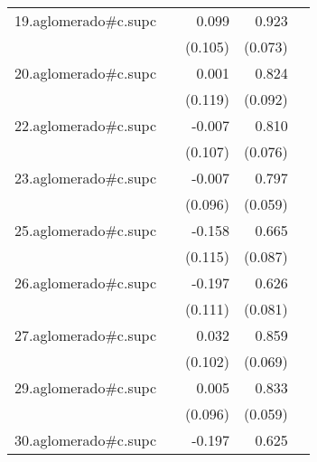 {\begin{longtable}{l*{4}{D{.}{.}{-1}}}
\addlinespace
19.aglomerado#c.supc&                     &       0.099         &       0.923\sym{***}&                     \\
            &                     &     (0.105)         &     (0.073)         &                     \\
\addlinespace
20.aglomerado#c.supc&                     &       0.001         &       0.824\sym{***}&                     \\
            &                     &     (0.119)         &     (0.092)         &                     \\
\addlinespace
22.aglomerado#c.supc&                     &      -0.007         &       0.810\sym{***}&                     \\
            &                     &     (0.107)         &     (0.076)         &                     \\
\addlinespace
23.aglomerado#c.supc&                     &      -0.007         &       0.797\sym{***}&                     \\
            &                     &     (0.096)         &     (0.059)         &                     \\
\addlinespace
25.aglomerado#c.supc&                     &      -0.158         &       0.665\sym{***}&                     \\
            &                     &     (0.115)         &     (0.087)         &                     \\
\addlinespace
26.aglomerado#c.supc&                     &      -0.197         &       0.626\sym{***}&                     \\
            &                     &     (0.111)         &     (0.081)         &                     \\
\addlinespace
27.aglomerado#c.supc&                     &       0.032         &       0.859\sym{***}&                     \\
            &                     &     (0.102)         &     (0.069)         &                     \\
\addlinespace
29.aglomerado#c.supc&                     &       0.005         &       0.833\sym{***}&                     \\
            &                     &     (0.096)         &     (0.059)         &                     \\
\addlinespace
30.aglomerado#c.supc&                     &      -0.197         &       0.625\sym{***}&                     \\

\end{longtable}}
